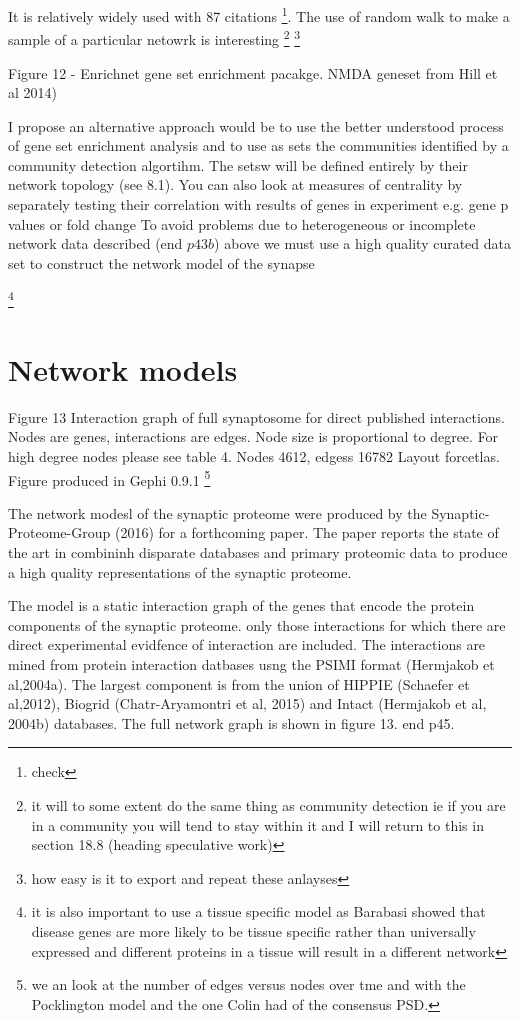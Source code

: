 It is relatively widely used with 87 citations \footnote{check}. The use of random walk to make a sample of a particular netowrk is interesting \footnote {it will to some extent do the same thing as community detection ie if you are in a community you will tend to stay within it and I will return to this in section 18.8 (heading speculative work)} \footnote {how easy is it to export and repeat these anlayses}

Figure 12 - Enrichnet gene set enrichment pacakge. NMDA geneset from Hill et al 2014)

I propose an alternative approach would be to use the better understood process of gene set enrichment analysis and to use as sets the communities identified by a community detection algortihm. The setsw will be defined entirely by their network topology (see 8.1).
 You can also look at measures of centrality by separately testing their correlation with results of genes in experiment e.g. gene p  values or fold change
 To avoid problems due to heterogeneous or incomplete network data described (end $p 43b$) above we must use a high quality curated data set to construct the network model of the synapse 

\footnote{it is also important to use a tissue specific model as Barabasi showed that disease genes are more likely to be tissue specific rather than universally expressed and different proteins in a tissue will result in a different network}

\section{Network models}

Figure 13 Interaction graph of full synaptosome for direct published interactions. Nodes are genes, interactions are edges. Node size is proportional to degree. For high degree nodes please see table 4. Nodes 4612, edgess 16782 Layout forcetlas. Figure produced in Gephi 0.9.1 \footnote{we an look at the number of edges versus nodes over tme and with the Pocklington model and the one Colin had of the consensus PSD.}

The network modesl of the synaptic proteome were produced by the Synaptic-Proteome-Group (2016) for a forthcoming paper. The paper reports the state of the art in combininh disparate databases and primary proteomic data to produce a high quality representations of the synaptic proteome. 

The model is a static interaction graph of the genes that encode the protein components of the synaptic proteome. only those interactions for which there are direct experimental evidfence of interaction are included. The interactions are mined from protein interaction datbases usng the PSIMI format (Hermjakob et al,2004a). The largest component is from the union of HIPPIE (Schaefer et al,2012), Biogrid (Chatr-Aryamontri et al, 2015) and Intact (Hermjakob et al, 2004b) databases. The full network graph is shown in figure 13. end p45.

